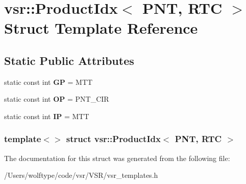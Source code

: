 \hypertarget{structvsr_1_1_product_idx_3_01_p_n_t_00_01_r_t_c_01_4}{\section{vsr\-:\-:Product\-Idx$<$ P\-N\-T, R\-T\-C $>$ Struct Template Reference}
\label{structvsr_1_1_product_idx_3_01_p_n_t_00_01_r_t_c_01_4}
}
\subsection*{Static Public Attributes}
\begin{DoxyCompactItemize}
\item 
\hypertarget{structvsr_1_1_product_idx_3_01_p_n_t_00_01_r_t_c_01_4_a2152e92e46151f724189e73ee0944287}{static const int {\bfseries G\-P} = M\-T\-T}\label{structvsr_1_1_product_idx_3_01_p_n_t_00_01_r_t_c_01_4_a2152e92e46151f724189e73ee0944287}

\item 
\hypertarget{structvsr_1_1_product_idx_3_01_p_n_t_00_01_r_t_c_01_4_a81e2b2b72532f84e808880f4e570b9d6}{static const int {\bfseries O\-P} = P\-N\-T\-\_\-\-C\-I\-R}\label{structvsr_1_1_product_idx_3_01_p_n_t_00_01_r_t_c_01_4_a81e2b2b72532f84e808880f4e570b9d6}

\item 
\hypertarget{structvsr_1_1_product_idx_3_01_p_n_t_00_01_r_t_c_01_4_a5bd029cffab796e376c853ac4a218790}{static const int {\bfseries I\-P} = M\-T\-T}\label{structvsr_1_1_product_idx_3_01_p_n_t_00_01_r_t_c_01_4_a5bd029cffab796e376c853ac4a218790}

\end{DoxyCompactItemize}
\subsubsection*{template$<$$>$ struct vsr\-::\-Product\-Idx$<$ P\-N\-T, R\-T\-C $>$}



The documentation for this struct was generated from the following file\-:\begin{DoxyCompactItemize}
\item 
/\-Users/wolftype/code/vsr/\-V\-S\-R/vsr\-\_\-templates.\-h\end{DoxyCompactItemize}

